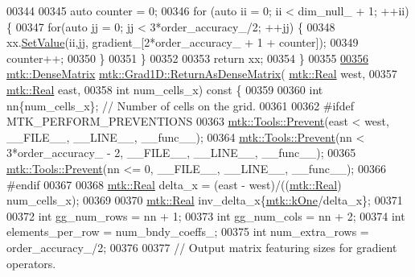 \begin{DoxyCode}
{{00344 
00345   \textcolor{keyword}{auto} counter = 0;
00346   \textcolor{keywordflow}{for} (\textcolor{keyword}{auto} ii = 0; ii < dim\_null\_ + 1; ++ii) \{
00347     \textcolor{keywordflow}{for}(\textcolor{keyword}{auto} jj = 0; jj < 3*order\_accuracy\_/2; ++jj) \{
00348       xx.\hyperlink{classmtk_1_1DenseMatrix_a784ce5784109ac86bfb9d8562b334b13}{SetValue}(ii,jj, gradient\_[2*order\_accuracy\_ + 1 + counter]);
00349       counter++;
00350     \}
00351   \}
00352 
00353   \textcolor{keywordflow}{return} xx;
00354 \}
00355 
\hypertarget{mtk__grad__1d_8cc_source_l00356}{}\hyperlink{classmtk_1_1Grad1D_a77b2eddbe4ab03f469306c604d505b1a}{00356} \hyperlink{classmtk_1_1DenseMatrix}{mtk::DenseMatrix} \hyperlink{classmtk_1_1Grad1D_a77b2eddbe4ab03f469306c604d505b1a}{mtk::Grad1D::ReturnAsDenseMatrix}(
      \hyperlink{group__c01-roots_gac080bbbf5cbb5502c9f00405f894857d}{mtk::Real} west,
00357                                                   \hyperlink{group__c01-roots_gac080bbbf5cbb5502c9f00405f894857d}{mtk::Real} east,
00358                                                   \textcolor{keywordtype}{int} num\_cells\_x)\textcolor{keyword}{ const }\{
00359 
00360   \textcolor{keywordtype}{int} nn\{num\_cells\_x\}; \textcolor{comment}{// Number of cells on the grid.}
00361 
00362 \textcolor{preprocessor}{  #ifdef MTK\_PERFORM\_PREVENTIONS}
00363   \hyperlink{classmtk_1_1Tools_a332324c6f25e66be9dff48c5987a3b9f}{mtk::Tools::Prevent}(east < west, \_\_FILE\_\_, \_\_LINE\_\_, \_\_func\_\_);
00364   \hyperlink{classmtk_1_1Tools_a332324c6f25e66be9dff48c5987a3b9f}{mtk::Tools::Prevent}(nn < 3*order\_accuracy\_ - 2, \_\_FILE\_\_, \_\_LINE\_\_, \_\_func\_\_);
00365   \hyperlink{classmtk_1_1Tools_a332324c6f25e66be9dff48c5987a3b9f}{mtk::Tools::Prevent}(nn <= 0, \_\_FILE\_\_, \_\_LINE\_\_, \_\_func\_\_);
00366 \textcolor{preprocessor}{  #endif}
00367 
00368   \hyperlink{group__c01-roots_gac080bbbf5cbb5502c9f00405f894857d}{mtk::Real} delta\_x = (east - west)/((\hyperlink{group__c01-roots_gac080bbbf5cbb5502c9f00405f894857d}{mtk::Real}) num\_cells\_x);
00369 
00370   \hyperlink{group__c01-roots_gac080bbbf5cbb5502c9f00405f894857d}{mtk::Real} inv\_delta\_x\{\hyperlink{group__c01-roots_ga26407c24d43b6b95480943340d285c71}{mtk::kOne}/delta\_x\};
00371 
00372   \textcolor{keywordtype}{int} gg\_num\_rows = nn + 1;
00373   \textcolor{keywordtype}{int} gg\_num\_cols = nn + 2;
00374   \textcolor{keywordtype}{int} elements\_per\_row = num\_bndy\_coeffs\_;
00375   \textcolor{keywordtype}{int} num\_extra\_rows = order\_accuracy\_/2;
00376 
00377   \textcolor{comment}{// Output matrix featuring sizes for gradient operators.}
}}
\end{DoxyCode}
